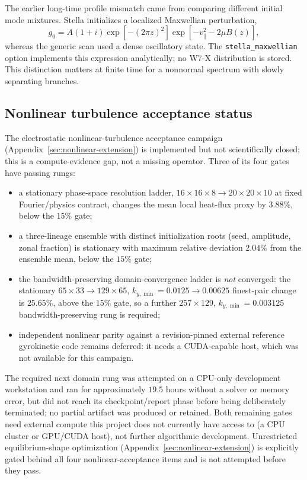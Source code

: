 \documentclass[11pt,a4paper]{article}
\begin{document}
The earlier long-time profile mismatch came from comparing different initial
mode mixtures.  Stella initializes a localized Maxwellian perturbation,
\[
g_0=A(1+i)\exp[-(2\pi z)^2]
\exp[-v_\parallel^2-2\mu B(z)],
\]
whereas the generic scan used a dense oscillatory state.  The
\texttt{stella\_maxwellian} option implements this expression analytically; no
W7-X distribution is stored.  This distinction matters at finite time for a
nonnormal spectrum with slowly separating branches.

\subsection{Nonlinear turbulence acceptance status}
\label{sec:nonlinear-acceptance-status}

The electrostatic nonlinear-turbulence acceptance campaign
(Appendix~\ref{sec:nonlinear-extension}) is implemented but not scientifically
closed; this is a compute-evidence gap, not a missing operator.  Three of its
four gates have passing rungs:
\begin{itemize}
  \item a stationary phase-space resolution ladder, \(16{\times}16{\times}8
  \to 20{\times}20{\times}10\) at fixed Fourier/physics contract, changes the
  mean local heat-flux proxy by \(3.88\%\), below the \(15\%\) gate;
  \item a three-lineage ensemble with distinct initialization roots (seed,
  amplitude, zonal fraction) is stationary with maximum relative deviation
  \(2.04\%\) from the ensemble mean, below the \(15\%\) gate;
  \item the bandwidth-preserving domain-convergence ladder is \emph{not}
  converged: the stationary \(65{\times}33\to129{\times}65\),
  \(k_{y,\min}=0.0125\to0.00625\) finest-pair change is \(25.65\%\), above the
  \(15\%\) gate, so a further \(257{\times}129\), \(k_{y,\min}=0.003125\)
  bandwidth-preserving rung is required;
  \item independent nonlinear parity against a revision-pinned external
  reference gyrokinetic code remains deferred: it needs a CUDA-capable host,
  which was not available for this campaign.
\end{itemize}
The required next domain rung was attempted on a CPU-only development
workstation and ran for approximately \(19.5\) hours without a solver or
memory error, but did not reach its checkpoint/report phase before being
deliberately terminated; no partial artifact was produced or retained.  Both
remaining gates need external compute this project does not currently have
access to (a CPU cluster or GPU/CUDA host), not further algorithmic
development.  Unrestricted equilibrium-shape optimization
(Appendix~\ref{sec:nonlinear-extension}) is explicitly gated behind all four
nonlinear-acceptance items and is not attempted before they pass.
\end{document}
